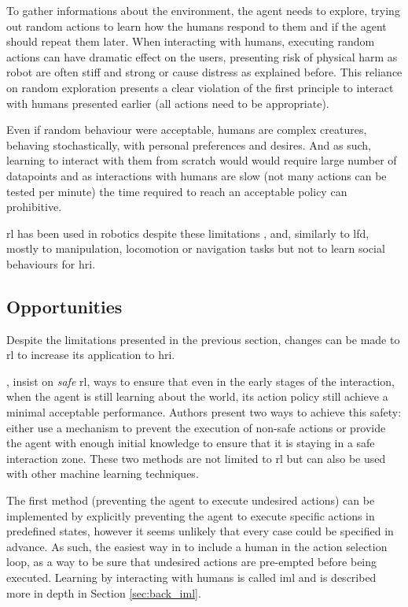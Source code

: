 	To gather informations about the environment, the agent needs to explore, trying out random actions to learn how the humans respond to them and if the agent should repeat them later. When interacting with humans, executing random actions can have dramatic effect on the users, presenting risk of physical harm as robot are often stiff and strong or cause distress as explained before. This reliance on random exploration presents a clear violation of the first principle to interact with humans presented earlier (all actions need to be appropriate).
	
	Even if random behaviour were acceptable, humans are complex creatures, behaving stochastically, with personal preferences and desires. And as such, learning to interact with them from scratch would would require large number of datapoints and as interactions with humans are slow (not many actions can be tested per minute) the time required to reach an acceptable policy can prohibitive. 
	
	\gls{rl} has been used in robotics despite these limitations \citep{kober2013reinforcement}, and, similarly to \gls{lfd}, mostly to manipulation, locomotion or navigation tasks but not to learn social behaviours for \gls{hri}. 
	
	
\subsection{Opportunities}  
	Despite the limitations presented in the previous section, changes can be made to \gls{rl} to increase its application to \gls{hri}.
	  
	\cite{garcia2015comprehensive}, insist on \textit{safe} \gls{rl}, ways to ensure that even in the early stages of the interaction, when the agent is still learning about the world, its action policy still achieve a minimal acceptable performance. Authors present two ways to achieve this safety: either use a mechanism to prevent the execution of non-safe actions or provide the agent with enough initial knowledge to ensure that it is staying in a safe interaction zone. These two methods are not limited to \gls{rl} but can also be used with other machine learning techniques. 
	
	The first method (preventing the agent to execute undesired actions) can be implemented by explicitly preventing the agent to execute specific actions in predefined states, however it seems unlikely that every case could be specified in advance. As such, the easiest way in to include a human in the action selection loop, as a way to be sure that undesired actions are pre-empted before being executed. Learning by interacting with humans is called \acrlong{iml} and is described more in depth in Section \ref{sec:back_iml}.
	
